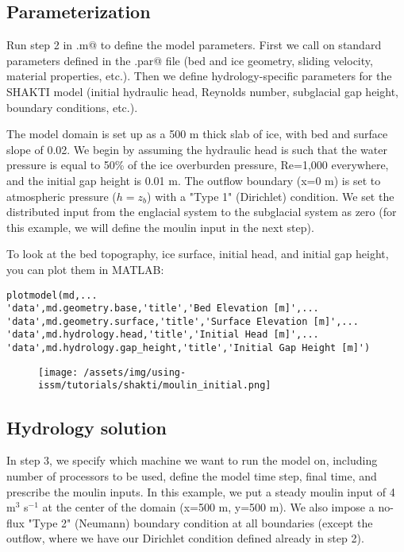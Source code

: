 \subsection{Parameterization}
Run step 2 in \verb@runme.m@ to define the model parameters. First we call on standard parameters defined in the \verb@moulin.par@ file (bed and ice geometry, sliding velocity, material properties, etc.). Then we define hydrology-specific parameters for the SHAKTI model (initial hydraulic head, Reynolds number, subglacial gap height, boundary conditions, etc.).

The model domain is set up as a 500 m thick slab of ice, with bed and surface slope of 0.02. We begin by assuming the hydraulic head is such that the water pressure is equal to 50\% of the ice overburden pressure, Re=1,000 everywhere, and the initial gap height is 0.01 m. The outflow boundary (x=0 m) is set to atmospheric pressure ($h=z_b$) with a "Type 1" (Dirichlet) condition. We set the distributed input from the englacial system to the subglacial system as zero (for this example, we will define the moulin input in the next step).

To look at the bed topography, ice surface, initial head, and initial gap height, you can plot them in MATLAB:

\begin{verbatim}plotmodel(md,...
'data',md.geometry.base,'title','Bed Elevation [m]',...
'data',md.geometry.surface,'title','Surface Elevation [m]',...
'data',md.hydrology.head,'title','Initial Head [m]',...
'data',md.hydrology.gap_height,'title','Initial Gap Height [m]')\end{verbatim}

\begin{figure}[H]
	\begin{center}
		\texttt{[image: /assets/img/using-issm/tutorials/shakti/moulin\_initial.png]}
	\end{center}
\end{figure}

\subsection{Hydrology solution}
In step 3, we specify which machine we want to run the model on, including number of processors to be used, define the model time step, final time, and prescribe the moulin inputs. In this example, we put a steady moulin input of 4 m$^3$ s$^{-1}$ at the center of the domain (x=500 m, y=500 m). We also impose a no-flux "Type 2" (Neumann) boundary condition at all boundaries (except the outflow, where we have our Dirichlet condition defined already in step 2).


